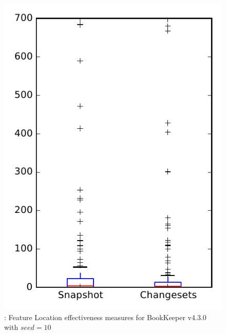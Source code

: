 
\begin{figure}
\centering
\includegraphics[height=0.4\textheight]{figures/flt_seed/rq1_bookkeeper_10}
\caption{\rone: Feature Location effectiveness measures for BookKeeper v4.3.0 with $seed=10$}
\label{fig:flt_seed:rq1:bookkeeper}
\end{figure}
